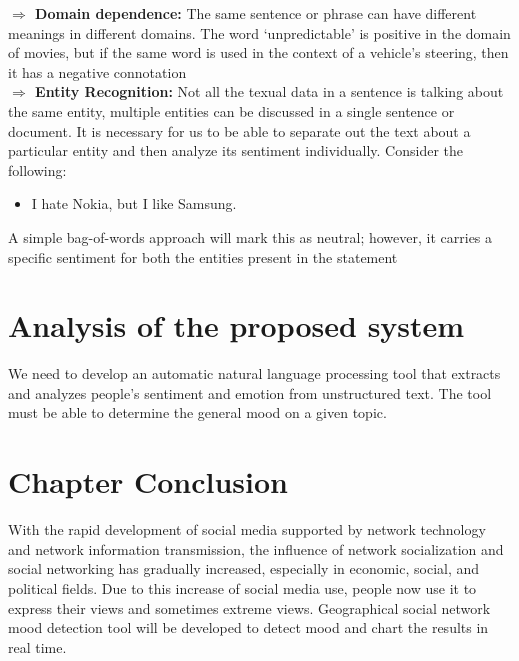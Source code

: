 \textbf{$\Rightarrow$ Domain dependence:} The same sentence or phrase can have different meanings in
different domains. The word ‘unpredictable’ is positive in the domain of movies, but if
the same word is used in the context of a vehicle's steering, then it has a negative
connotation \cite{ref20}\\


\textbf{$\Rightarrow$ Entity Recognition:} Not all the texual data in a sentence is talking about the same entity, multiple entities can be discussed in a single sentence or document. It is necessary for us to be able to separate out the text about a particular entity and then analyze its sentiment individually. Consider the
following:
\begin{itemize}
\item I hate Nokia, but I like Samsung.
\end{itemize}
A simple bag-of-words approach will mark this as neutral; however, it carries a specific sentiment
for both the entities present in the statement \cite{ref20}



\section{Analysis of the proposed system}
We need to develop an automatic natural language processing tool that extracts and analyzes people’s sentiment and emotion from unstructured text. The tool must be able to determine the general mood on a given topic.

\section{Chapter Conclusion}
With the rapid development of social media supported by network technology and network
information transmission, the influence of network socialization and social networking has
gradually increased, especially in economic, social, and political fields. Due to this increase of
social media use, people now use it to express their views and sometimes extreme views. Geographical
social network mood detection tool will be developed to detect mood and chart the results in real time.\\

